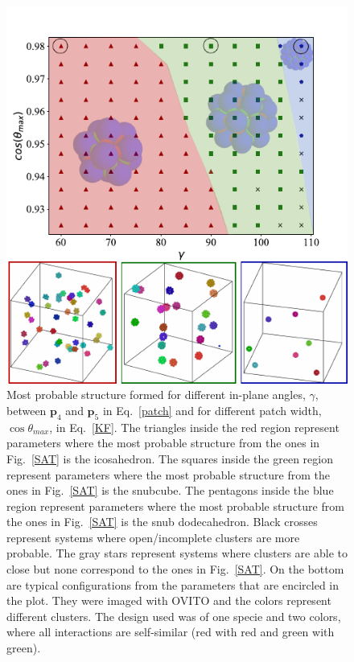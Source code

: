 \documentclass[a4paper, amsfonts, amssymb, amsmath, reprint, showkeys, nofootinbib, twoside]{revtex4-1}
\begin{document}
\begin{figure}[t]
	\includegraphics{fig3.pdf}
	\caption{\label{N1c2} Most probable structure formed for different in-plane angles, $\gamma$, between $\textbf{p}_4$ and $\textbf{p}_5$ in Eq.~\ref{patch} and for different patch width, $\cos\theta_{max}$, in Eq.~\ref{KF}. The triangles inside the red region represent parameters where the most probable structure from the ones in Fig.~\ref{SAT} is the icosahedron. The squares inside the green region represent parameters where the most probable structure from the ones in Fig.~\ref{SAT} is the snubcube. The pentagons inside the blue region represent parameters where the most probable structure from the ones in Fig.~\ref{SAT} is the snub dodecahedron. Black crosses represent systems where open/incomplete clusters are more probable. The gray stars represent systems where clusters are able to close but none correspond to the ones in Fig.~\ref{SAT}. On the bottom are typical configurations from the parameters that are encircled in the plot. They were imaged with OVITO and the colors represent different clusters. The design used was of one specie and two colors, where all interactions are self-similar (red with red and green with green).}
\end{figure}
\end{document}
